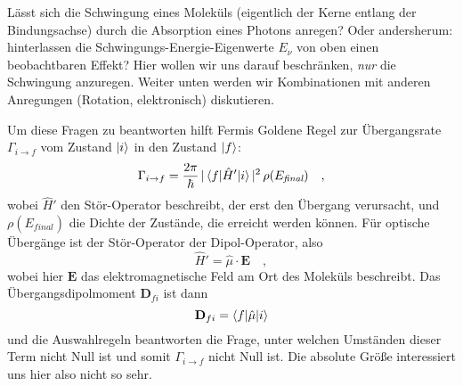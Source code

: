 Lässt sich die Schwingung eines Moleküls (eigentlich der Kerne entlang der Bindungsachse) durch die Absorption eines Photons anregen? Oder andersherum: hinterlassen die Schwingungs-Energie-Eigenwerte $E_\nu$ von oben einen beobachtbaren Effekt? Hier wollen wir uns darauf beschränken, \emph{nur} die Schwingung anzuregen. Weiter unten werden wir Kombinationen mit anderen Anregungen (Rotation, elektronisch) diskutieren.

Um diese Fragen zu beantworten hilft Fermis Goldene Regel zur Übergangsrate $\Gamma_{i \rightarrow f}$ vom Zustand $\ket{i}$ in den Zustand $\ket{f}$:
\begin{equation}
\Gamma_{i \rightarrow f} = \frac{2 \pi}{\hbar} \, |\braket{f | \hat{H}' | i} |^2 \, \rho(E_\textit{final}) \quad ,
\end{equation}
wobei $\hat{H}'$ den Stör-Operator beschreibt, der erst den Übergang verursacht, und $ \rho(E_\textit{final})$ die Dichte der Zustände, die erreicht werden können. Für optische Übergänge ist der Stör-Operator der Dipol-Operator, also
\begin{equation}
\hat{H}' = \hat{\mu} \cdot \mathbf{E} \quad ,
\end{equation}
wobei hier $\mathbf{E}$ das elektromagnetische Feld am Ort des Moleküls beschreibt. Das Übergangsdipolmoment $\mathbf{D}_{fi}$ ist dann 
\begin{equation}
 \mathbf{D}_{fi} = \braket{f | \hat{\mu} | i} 
\end{equation}
und die Auswahlregeln beantworten die Frage, unter welchen Umständen dieser Term nicht Null ist und somit $\Gamma_{i \rightarrow f} $ nicht Null ist. Die absolute Größe interessiert uns hier also nicht so sehr.

